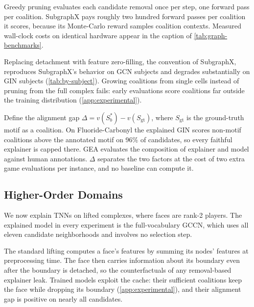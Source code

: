  Greedy pruning evaluates each candidate
removal once per step, one forward pass per coalition. SubgraphX pays
roughly two hundred forward passes per coalition it scores, because its
Monte-Carlo reward samples coalition contexts. Measured wall-clock
costs on identical hardware appear in the caption of
\cref{tab:graph-benchmarks}.

 Replacing detachment with feature zero-filling,
the convention of SubgraphX, reproduces SubgraphX's behavior on GCN
subjects and degrades substantially on GIN subjects
(\cref{tab:by-subject}). Growing coalitions from single cells instead of
pruning from the full complex fails: early evaluations score
coalitions far outside the training distribution
(\cref{app:experimental}).

 Define the
alignment gap $\Delta = v(S^{*}_{b}) - v(S_{\mathrm{gt}})$, where
$S_{\mathrm{gt}}$ is the ground-truth motif as a coalition. On
Fluoride-Carbonyl the explained GIN scores non-motif coalitions above
the annotated motif on 96\% of candidates, so every faithful explainer
is capped there. GEA evaluates the composition of explainer and model
against human annotations. $\Delta$ separates the two factors at the
cost of two extra game evaluations per instance, and no baseline can
compute it.

\subsection{Higher-Order Domains}
\label{sec:predictions-higher}

We now explain TNNs on lifted complexes, where faces are rank-2
players. The explained model in every experiment is the
full-vocabulary GCCN, which uses all eleven candidate neighborhoods
and involves no selection step.

 The standard lifting
computes a face's features by summing its nodes' features at
preprocessing time. The face then carries information about its
boundary even after the boundary is detached, so the counterfactuals
of any removal-based explainer leak. Trained models exploit the cache:
their sufficient coalitions keep the face while dropping its
boundary (\cref{app:experimental}), and their alignment gap is
positive on nearly all candidates.

